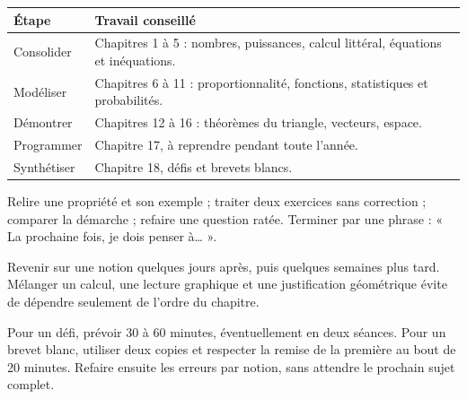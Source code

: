 \clearpage\thispagestyle{otFront}\label{parcours}\fontsize{11}{15}\selectfont

\begin{tabularx}{\linewidth}{@{}lY@{}}\toprule
Étape & Travail conseillé\\\midrule
Consolider & Chapitres 1 à 5 : nombres, puissances, calcul littéral, équations et inéquations.\\[3mm]
Modéliser & Chapitres 6 à 11 : proportionnalité, fonctions, statistiques et probabilités.\\[3mm]
Démontrer & Chapitres 12 à 16 : théorèmes du triangle, vecteurs, espace.\\[3mm]
Programmer & Chapitre 17, à reprendre pendant toute l’année.\\[3mm]
Synthétiser & Chapitre 18, défis et brevets blancs.\\\bottomrule
\end{tabularx}
\begin{savoirfaire}Relire une propriété et son exemple ; traiter deux exercices sans correction ; comparer la démarche ; refaire une question ratée. Terminer par une phrase : « La prochaine fois, je dois penser à… ».\end{savoirfaire}
\begin{savoirfaire}Revenir sur une notion quelques jours après, puis quelques semaines plus tard. Mélanger un calcul, une lecture graphique et une justification géométrique évite de dépendre seulement de l’ordre du chapitre.\end{savoirfaire}
Pour un défi, prévoir 30 à 60 minutes, éventuellement en deux séances.
Pour un brevet blanc, utiliser deux copies et respecter la remise de la
première au bout de 20 minutes. Refaire ensuite les erreurs par notion,
sans attendre le prochain sujet complet.

\clearpage
